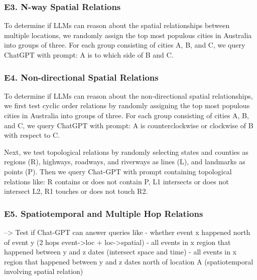 \subsubsection{E3. N-way Spatial Relations}
To determine if LLMs can reason about the spatial relationships between multiple locations, we randomly assign the top  most populous cities in Australia into  groups of three.
For each group consisting of cities A, B, and C, we query ChatGPT with prompt: A is to which side of B and C.


\subsubsection{E4. Non-directional Spatial Relations}
To determine if LLMs can reason about the non-directional spatial relationships, we first test cyclic order relations by randomly assigning the top  most populous cities in Australia into  groups of three.
For each group consisting of cities A, B, and C, we query ChatGPT with prompt: A is counterclockwise or clockwise of B with respect to C.

Next, we test topological relations by randomly selecting states and counties as regions (R), highways, roadways, and riverways as lines (L), and landmarks as points (P).
Then we query Chat-GPT with prompt containing topological relations like: R contains or does not contain P, L1 intersects or does not intersect L2, R1 touches or does not touch R2. 


\subsubsection{E5. Spatiotemporal and Multiple Hop Relations}
--> Test if Chat-GPT can answer queries like
- whether event x happened north of event y (2 hops event->loc + loc->spatial)
- all events in x region that happened between y and z dates (intersect space and time)
- all events in x region that happened between y and z dates north of location A (spatiotemporal involving spatial relation)








